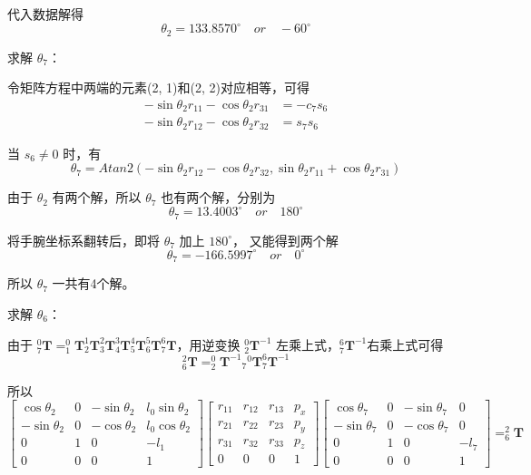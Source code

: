 \documentclass{homework}
\begin{document}
\begin{sol}
代入数据解得
\[
  \theta_2 = 133.8570^\circ \quad or \quad -60^\circ
\]

求解 $ \theta_7 $：

令矩阵方程中两端的元素(2, 1)和(2, 2)对应相等，可得
\begin{align*}
  -\sin\theta_2 r_{11} - \cos\theta_2 r_{31} &= -c_{7} s_{6} \\
  -\sin\theta_2 r_{12} - \cos\theta_2 r_{32} &= s_{7} s_{6}
\end{align*}

当 $ s_6 \neq 0 $ 时，有
\[
  \theta_7 = Atan2(-\sin\theta_2 r_{12} - \cos\theta_2 r_{32}, \sin\theta_2 r_{11} + \cos\theta_2 r_{31})
\]

由于 $ \theta_2 $ 有两个解，所以 $ \theta_7 $ 也有两个解，分别为
\[
  \theta_7 = 13.4003^\circ \quad or \quad 180^\circ
\]

将手腕坐标系翻转后，即将 $ \theta_7 $ 加上 $ 180^\circ $， 又能得到两个解
\[
  \theta_7 = -166.5997^\circ \quad or \quad 0^\circ
\]

所以 $ \theta_7 $ 一共有4个解。

求解 $ \theta_6 $：

由于 $ _7^0\mathbf{T} = _1^0\mathbf{T} _2^1\mathbf{T} _3^2\mathbf{T} _4^3\mathbf{T} _5^4\mathbf{T} _6^5\mathbf{T} _7^6\mathbf{T} $，用逆变换 $ _2^0\mathbf{T}^{-1} $ 左乘上式，$ _7^6\mathbf{T}^{-1} $右乘上式可得
\[
  _6^2\mathbf{T} = _2^0\mathbf{T}^{-1} {_7}^0\mathbf{T} _7^6\mathbf{T}^{-1}
\]

所以
\[
  \begin{bmatrix}
    \cos\theta_2 & 0 & -\sin\theta_2 & l_0 \sin\theta_2 \\
    -\sin\theta_2 & 0 & -\cos\theta_2 & l_0 \cos\theta_2 \\
    0 & 1 & 0 & -l_1 \\
    0 & 0 & 0 & 1
  \end{bmatrix}
  \begin{bmatrix} 
    r_{11} & r_{12} & r_{13} & p_x \\ 
    r_{21} & r_{22} & r_{23} & p_y \\ 
    r_{31} & r_{32} & r_{33} & p_z \\ 
    0 & 0 & 0 & 1
  \end{bmatrix} 
  \begin{bmatrix}
    \cos\theta_7 & 0 & -\sin\theta_7 & 0 \\
    -\sin\theta_7 & 0 & -\cos\theta_7 & 0 \\
    0 & 1 & 0 & -l_7 \\
    0 & 0 & 0 & 1
  \end{bmatrix} = _6^2\mathbf{T}
\]


\end{sol}
\end{document}
